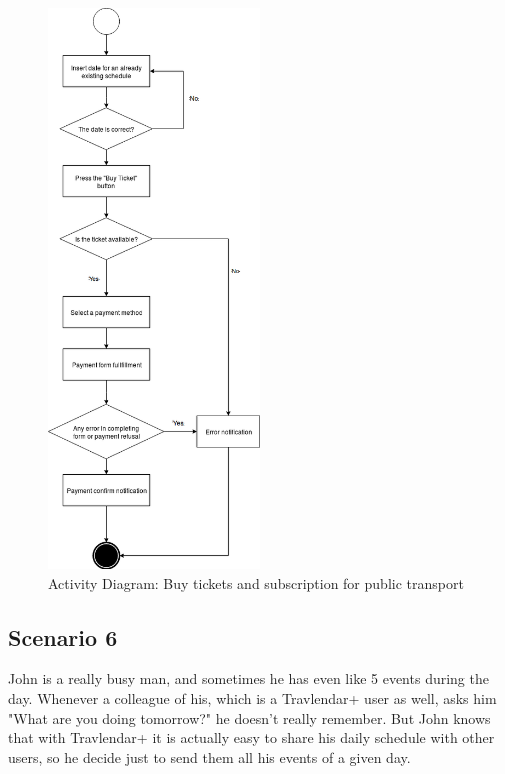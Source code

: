 \documentclass[numbers=noenddot, 12pt, a4paper, oneside]{scrbook}
\begin{document}
\begin{figure}[H]
	\centering
	\includegraphics[width=0.5\textwidth]{flows/Scenario5}
	\caption{Activity Diagram: Buy tickets and subscription for public transport}
\end{figure}

\subsection*{Scenario 6}

John is a really busy man, and sometimes he has even like 5 events during the day. Whenever a colleague of his, which is a Travlendar+ user as well, asks him "What are you doing tomorrow?" he doesn't really remember. But John knows that with Travlendar+ it is actually easy to share his daily schedule with other users, so he decide just to send them all his events of a given day.
\\
\end{document}
